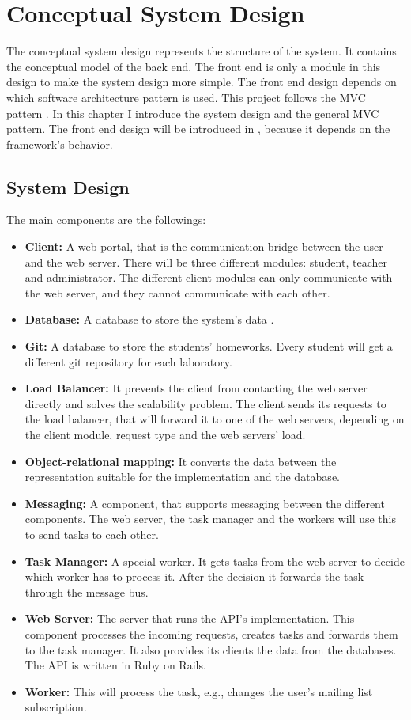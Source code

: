 \chapter{Conceptual System Design}
The conceptual system design represents the structure of the system. It contains the conceptual model of the back end. The front end is only a module in this design to make the system design more simple. The front end design depends on which software architecture pattern is used. This project follows the MVC pattern . In this chapter I introduce the system design and the general MVC pattern. The front end design will be introduced in , because it depends on the framework's behavior.

\section{System Design}

The main components are the followings:

\begin{itemize}
	\item \textbf{Client:} A web portal, that is the communication bridge between the user and the web server. There will be three different modules: student, teacher and administrator. The different client modules can only communicate with the web server, and they cannot communicate with each other.
	\item \textbf{Database:} A database to store the system's data . 
	\item \textbf{Git:} A database to store the students' homeworks. Every student will get a different git repository for each laboratory.
	\item \textbf{Load Balancer:} It prevents the client from contacting the web server directly and solves the scalability problem. The client sends its requests to the load balancer, that will forward it to one of the web servers, depending on the client module, request type and the web servers' load.
	\item \textbf{Object-relational mapping:} It converts the data between the representation suitable for the implementation and the database. 
	\item \textbf{Messaging:} A component, that supports messaging between the different components. The web server, the task manager and the workers will use this to send tasks to each other.
	\item \textbf{Task Manager:} A special worker. It gets tasks from the web server to decide which worker has to process it. After the decision it forwards the task through the message bus.
	\item \textbf{Web Server:} The server that runs the API's implementation. This component processes the incoming requests, creates tasks and forwards them to the task manager. It also provides its clients the data from the databases. The API is written in Ruby on Rails. 
	\item \textbf{Worker:} This will process the task, e.g., changes the user's mailing list subscription.
\end{itemize}


